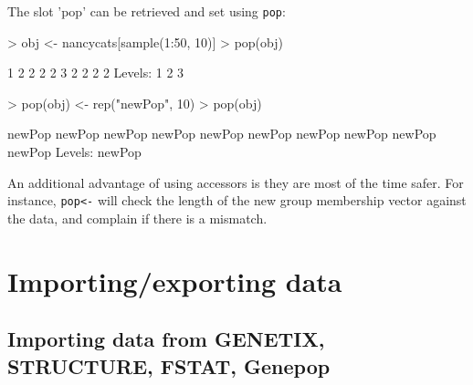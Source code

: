\documentclass{article}
\begin{document}
\noindent The slot 'pop' can be retrieved and set using \texttt{pop}:
\begin{Schunk}
\begin{Sinput}
> obj <- nancycats[sample(1:50, 10)]
> pop(obj)
\end{Sinput}
\begin{Soutput}
 [1] 1 2 2 2 2 3 2 2 2 2
Levels: 1 2 3
\end{Soutput}
\begin{Sinput}
> pop(obj) <- rep("newPop", 10)
> pop(obj)
\end{Sinput}
\begin{Soutput}
 [1] newPop newPop newPop newPop newPop newPop newPop newPop newPop newPop
Levels: newPop
\end{Soutput}
\end{Schunk}
An additional advantage of using accessors is they are most of the time safer. For instance,
\texttt{pop<-} will check the length of the new group membership vector against the data, and
complain if there is a mismatch.






\section{Importing/exporting data}


\subsection{Importing data from GENETIX, STRUCTURE, FSTAT, Genepop}
\end{document}

